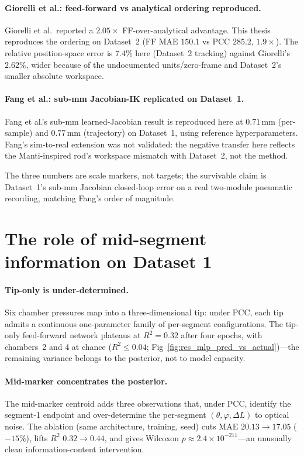 \paragraph{Giorelli et al.: feed-forward vs analytical ordering reproduced.}
Giorelli et al.\ reported a $2.05\times$ FF-over-analytical advantage. This thesis reproduces the ordering on Dataset~2 (FF MAE $150.1$ vs PCC $285.2$, $1.9\times$). The relative position-space error is $7.4\%$ here (Dataset~2 tracking) against Giorelli's $2.62\%$, wider because of the undocumented units/zero-frame and Dataset~2's smaller absolute workspace.

\paragraph{Fang et al.: sub-mm Jacobian-IK replicated on Dataset~1.}
Fang et al.'s sub-mm learned-Jacobian result \cite{fang2022jacobian} is reproduced here at $0.71$\,mm (per-sample) and $0.77$\,mm (trajectory) on Dataset~1, using reference hyperparameters. Fang's sim-to-real extension was not validated: the negative transfer here reflects the Manti-inspired rod's workspace mismatch with Dataset~2, not the method.

The three numbers are scale markers, not targets; the survivable claim is Dataset~1's sub-mm Jacobian closed-loop error on a real two-module pneumatic recording, matching Fang's order of magnitude.

\section{The role of mid-segment information on Dataset 1}
\label{sec:disc_mid}

\paragraph{Tip-only is under-determined.}
Six chamber pressures map into a three-dimensional tip: under PCC, each tip admits a continuous one-parameter family of per-segment configurations. The tip-only feed-forward network plateaus at $R^{2} = 0.32$ after four epochs, with chambers~2 and 4 at chance ($R^{2} \le 0.04$; Fig~\ref{fig:res_mlp_pred_vs_actual})---the remaining variance belongs to the posterior, not to model capacity.

\paragraph{Mid-marker concentrates the posterior.}
The mid-marker centroid adds three observations that, under PCC, identify the segment-1 endpoint and over-determine the per-segment $(\theta, \varphi, \Delta L)$ to optical noise. The ablation (same architecture, training, seed) cuts MAE $20.13 \to 17.05$ ($-15\%$), lifts $R^{2}$ $0.32 \to 0.44$, and gives Wilcoxon $p \approx 2.4 \times 10^{-211}$---an unusually clean information-content intervention.

